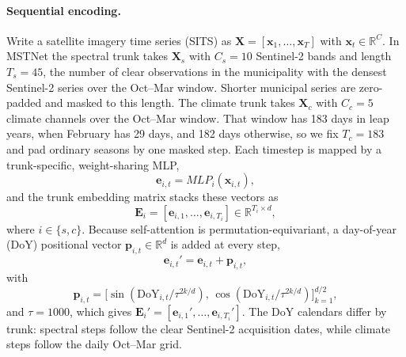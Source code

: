 \paragraph{Sequential encoding.}
Write a satellite imagery time series (SITS) as $\mathbf{X}=[\mathbf{x}_1,\ldots,\mathbf{x}_T]$ with $\mathbf{x}_t\in\mathbb{R}^{C}$.
In MSTNet the spectral trunk takes $\mathbf{X}_s$ with $C_s=10$ Sentinel-2 bands and length $T_s=45$, the number of clear observations in the municipality with the densest Sentinel-2 series over the Oct--Mar window.
Shorter municipal series are zero-padded and masked to this length.
The climate trunk takes $\mathbf{X}_c$ with $C_c=5$ climate channels over the Oct--Mar window.
That window has 183 days in leap years, when February has 29 days, and 182 days otherwise, so we fix $T_c=183$ and pad ordinary seasons by one masked step.
Each timestep is mapped by a trunk-specific, weight-sharing MLP,
\begin{equation}
  \mathbf{e}_{i,t} = MLP_i(\mathbf{x}_{i,t}),
  \label{eq:mlp-step}
\end{equation}
and the trunk embedding matrix stacks these vectors as
\begin{equation}
  \mathbf{E}_i=[\mathbf{e}_{i,1},\ldots,\mathbf{e}_{i,T_i}]\in\mathbb{R}^{T_i\times d},
  \label{eq:mlp-encode}
\end{equation}
where $i\in\{s,c\}$.
Because self-attention is permutation-equivariant, a day-of-year (DoY) positional vector $\mathbf{p}_{i,t}\in\mathbb{R}^{d}$ is added at every step,
\begin{equation}
  \mathbf{e}_{i,t}' = \mathbf{e}_{i,t} + \mathbf{p}_{i,t},
  \label{eq:doy-add}
\end{equation}
with
\begin{equation}
  \mathbf{p}_{i,t}
  =
  \bigl[\sin(\mathrm{DoY}_{i,t}/\tau^{2k/d}),\,
        \cos(\mathrm{DoY}_{i,t}/\tau^{2k/d})\bigr]_{k=1}^{d/2},
  \label{eq:doy-pe}
\end{equation}
and $\tau=1000$, which gives $\mathbf{E}_i'=[\mathbf{e}_{i,1}',\ldots,\mathbf{e}_{i,T_i}']$.
The DoY calendars differ by trunk: spectral steps follow the clear Sentinel-2 acquisition dates, while climate steps follow the daily Oct--Mar grid.

